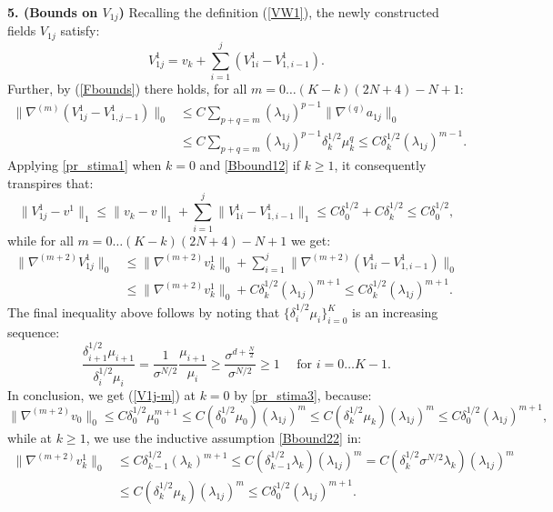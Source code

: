 \documentclass[reqno,twoside,11pt]{amsart}
\numberwithin{equation}{section}
\theoremstyle{plain}
\theoremstyle{definition}
\begin{document}
{\bf 5. (Bounds on $V_{1j}$)} Recalling the definition (\ref{VW1}),
the newly constructed fields $V_{1j}$ satisfy:
$$V_{1j}^1 = v_k + \sum_{i=1}^j (V_{1i}^1-V_{1,i-1}^1).$$
Further, by (\ref{Fbounds}) there holds, for all $m=0\ldots (K-k)(2N+4)-N+1$:
\begin{equation*}
\begin{split}
\|\nabla^{(m)}(V_{1j}^1-V_{1,j-1}^1)\|_0 & \leq C\sum_{p+q=m}
(\lambda_{1j})^{p-1}\|\nabla^{(q)}a_{1j} \|_0\\ &\leq C\sum_{p+q=m}
(\lambda_{1j})^{p-1}\delta_{k}^{1/2}\mu_k^q\leq
C\delta_k^{1/2}(\lambda_{1j})^{m-1}.
\end{split}
\end{equation*}
Applying \ref{pr_stima1} when $k=0$ and \ref{Bbound12} if $k\geq 1$,
it consequently transpires that:
\begin{equation}\label{V1j-1}
\|V_{1j}^1- v^1\|_1\leq \|v_k-v\|_1 + \sum_{i=1}^j \|V_{1i}^1-V_{1,i-1}^1\|_1
\leq C\delta_0^{1/2}+  C\delta_k^{1/2}\leq C\delta_0^{1/2}, 
\end{equation}
while for all $m=0\ldots (K-k)(2N+4)-N+1$ we get:
\begin{equation}\label{V1j-m}
\begin{split}
\|\nabla^{(m+2)}V_{1j}^1\|_0& \leq \|\nabla^{(m+2)}v_k^1\|_0 +
\sum_{i=1}^j \|\nabla^{(m+2)}(V_{1i}^1-V_{1,i-1}^1)\|_0
\\ & \leq  \|\nabla^{(m+2)}v_k^1\|_0 +
C \delta_k^{1/2}(\lambda_{1j})^{m+1}\leq C \delta_k^{1/2}(\lambda_{1j})^{m+1}.
\end{split}
\end{equation}
The final inequality above follows by noting that
$\{\delta_i^{1/2}\mu_i\}_{i=0}^K$ is an increasing sequence:
\begin{equation}\label{increase}
\frac{\delta_{i+1}^{1/2}\mu_{i+1}}{\delta_i^{1/2}\mu_i} =
\frac{1}{\sigma^{N/2}} \frac{\mu_{i+1}}{\mu_i} \geq
\frac{\sigma^{d+\frac{N}{2}}}{\sigma^{N/2}} \geq 1 \quad \mbox{ for } i=0\ldots K-1.
\end{equation}
In conclusion, we get (\ref{V1j-m}) at $k=0$ by \ref{pr_stima3}, because:
$$\|\nabla^{(m+2)}v_0\|_0\leq C \delta_0^{1/2} \mu_0^{m+1}\leq C
(\delta_0^{1/2} \mu_0)(\lambda_{1j})^m \leq C (\delta_k^{1/2}
\mu_k)(\lambda_{1j})^m \leq C \delta_0^{1/2} (\lambda_{1j})^{m+1},$$
while at $k\geq 1$, we use the inductive assumption \ref{Bbound22} in:
\begin{equation*}
\begin{split}
\|\nabla^{(m+2)}v_k^1\|_0& \leq C \delta_{k-1}^{1/2} (\lambda_k)^{m+1}\leq C
(\delta_{k-1}^{1/2} \lambda_k)(\lambda_{1j})^m = C (\delta_k^{1/2}\sigma^{N/2}
\lambda_k)(\lambda_{1j})^m \\ & \leq C (\delta_k^{1/2}
\mu_k)(\lambda_{1j})^m \leq C \delta_0^{1/2} (\lambda_{1j})^{m+1}.
\end{split}
\end{equation*}
\end{document}
